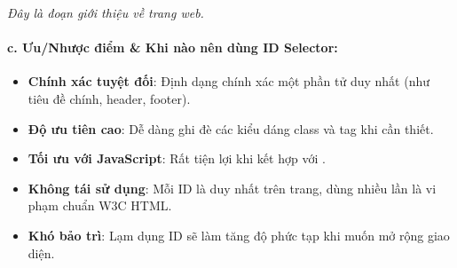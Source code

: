 \begin{browserWindow}
\sffamily\small
{} \par\vspace{4pt}
\flushleft
\textcolor{gray!80}{\large\textit{Đây là đoạn giới thiệu về trang web.}} \par\vspace{4pt}
\end{browserWindow}

\paragraph{c. Ưu/Nhược điểm \& Khi nào nên dùng ID Selector:}

\begin{tipBox}
\begin{itemize}[leftmargin=1.5em, itemsep=2pt, parsep=0pt]
    \item \textbf{Chính xác tuyệt đối}: Định dạng chính xác một phần tử duy nhất (như tiêu đề chính, header, footer).
    \item \textbf{Độ ưu tiên cao}: Dễ dàng ghi đè các kiểu dáng class và tag khi cần thiết.
    \item \textbf{Tối ưu với JavaScript}: Rất tiện lợi khi kết hợp với .
\end{itemize}
\end{tipBox}

\begin{warnBox}
\begin{itemize}[leftmargin=1.5em, itemsep=2pt, parsep=0pt]
    \item \textbf{Không tái sử dụng}: Mỗi ID là duy nhất trên trang, dùng nhiều lần là vi phạm chuẩn W3C HTML.
    \item \textbf{Khó bảo trì}: Lạm dụng ID sẽ làm tăng độ phức tạp khi muốn mở rộng giao diện.
\end{itemize}
\end{warnBox}

